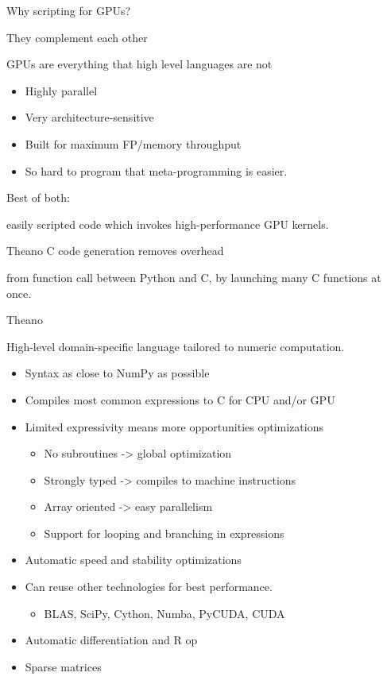 \documentclass[utf8x,xcolor=pdftex,dvipsnames,table]{beamer}
\begin{document}
\begin{frame}{Why scripting for GPUs?}
  \begin{bf}They complement each other\end{bf}

  GPUs are everything that high level languages are not

  \begin{itemize}
    \item Highly parallel
    \item Very architecture-sensitive
    \item Built for maximum FP/memory throughput
    \item So hard to program that meta-programming is easier.
  \end{itemize}

  \begin{bf}Best of both:\end{bf} easily scripted code which invokes high-performance GPU kernels.

  \begin{bf}Theano C code generation removes overhead\end{bf} from
  function call between Python and C, by launching many C functions at once.

\end{frame}

\begin{frame}{Theano}

  High-level domain-specific language tailored to numeric computation.

  \begin{itemize}
    \item Syntax as close to NumPy as possible
    \item Compiles most common expressions to C for CPU and/or GPU
    \item Limited expressivity means more opportunities optimizations
    \begin{itemize}
      \item No subroutines -> global optimization
      \item Strongly typed -> compiles to machine instructions
      \item Array oriented -> easy parallelism
      \item Support for looping and branching in expressions
    \end{itemize}
    \item Automatic speed and stability optimizations
    \item Can reuse other technologies for best performance.
    \begin{itemize}
      \item BLAS, SciPy, Cython, Numba, PyCUDA, CUDA
    \end{itemize}
    \item Automatic differentiation and R op
    \item Sparse matrices
  \end{itemize}
\end{frame}
\end{document}
